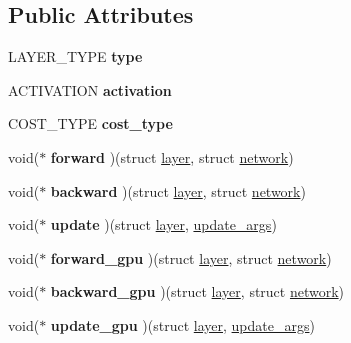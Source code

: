 \subsection*{Public Attributes}
\begin{DoxyCompactItemize}
\item 
\mbox{\label{structlayer_af00e36adaf6e404a3e5234843c723714}} 
L\+A\+Y\+E\+R\+\_\+\+T\+Y\+PE {\bfseries type}
\item 
\mbox{\label{structlayer_af7e837568a9975545159025b2fdbf31a}} 
A\+C\+T\+I\+V\+A\+T\+I\+ON {\bfseries activation}
\item 
\mbox{\label{structlayer_a8f172c29b1ada15656f1f346e7491507}} 
C\+O\+S\+T\+\_\+\+T\+Y\+PE {\bfseries cost\+\_\+type}
\item 
\mbox{\label{structlayer_ad587958fc9c301a5987df7b3d68a09c1}} 
void($\ast$ {\bfseries forward} )(struct \hyperlink{structlayer}{layer}, struct \hyperlink{structnetwork}{network})
\item 
\mbox{\label{structlayer_a97391cfa71ea05cd917a3919f00e14a6}} 
void($\ast$ {\bfseries backward} )(struct \hyperlink{structlayer}{layer}, struct \hyperlink{structnetwork}{network})
\item 
\mbox{\label{structlayer_aefdbd48c48e52160fd806da7973de6e8}} 
void($\ast$ {\bfseries update} )(struct \hyperlink{structlayer}{layer}, \hyperlink{structupdate__args}{update\+\_\+args})
\item 
\mbox{\label{structlayer_ae96ac4b6c9470848c52dddc95cb14b6a}} 
void($\ast$ {\bfseries forward\+\_\+gpu} )(struct \hyperlink{structlayer}{layer}, struct \hyperlink{structnetwork}{network})
\item 
\mbox{\label{structlayer_aedf9ba6db46b7291b41f424ff6346784}} 
void($\ast$ {\bfseries backward\+\_\+gpu} )(struct \hyperlink{structlayer}{layer}, struct \hyperlink{structnetwork}{network})
\item 
\mbox{\label{structlayer_a820d8c7a9764dae29abe87e12f89b19e}} 
void($\ast$ {\bfseries update\+\_\+gpu} )(struct \hyperlink{structlayer}{layer}, \hyperlink{structupdate__args}{update\+\_\+args})

\end{DoxyCompactItemize}
